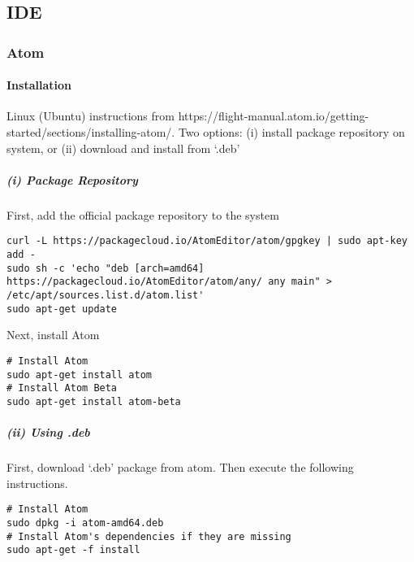 \subsection{IDE}

\subsubsection{Atom}


\paragraph{Installation}

Linux (Ubuntu) instructions from https://flight-manual.atom.io/getting-started/sections/installing-atom/. Two options: (i) install package repository on system, or (ii) download and install from `.deb'

\subparagraph{(i) Package Repository}

First, add the official package repository to the system
\begin{lstlisting}[style=terminalBash]
curl -L https://packagecloud.io/AtomEditor/atom/gpgkey | sudo apt-key add -
sudo sh -c 'echo "deb [arch=amd64] https://packagecloud.io/AtomEditor/atom/any/ any main" > /etc/apt/sources.list.d/atom.list'
sudo apt-get update
\end{lstlisting}

Next, install Atom
\begin{lstlisting}[style=terminalBash]
# Install Atom
sudo apt-get install atom
# Install Atom Beta
sudo apt-get install atom-beta
\end{lstlisting}

\subparagraph{(ii) Using .deb}

First, download `.deb' package from atom. Then execute the following instructions.
\begin{lstlisting}[style=terminalBash]
# Install Atom
sudo dpkg -i atom-amd64.deb
# Install Atom's dependencies if they are missing
sudo apt-get -f install
\end{lstlisting}